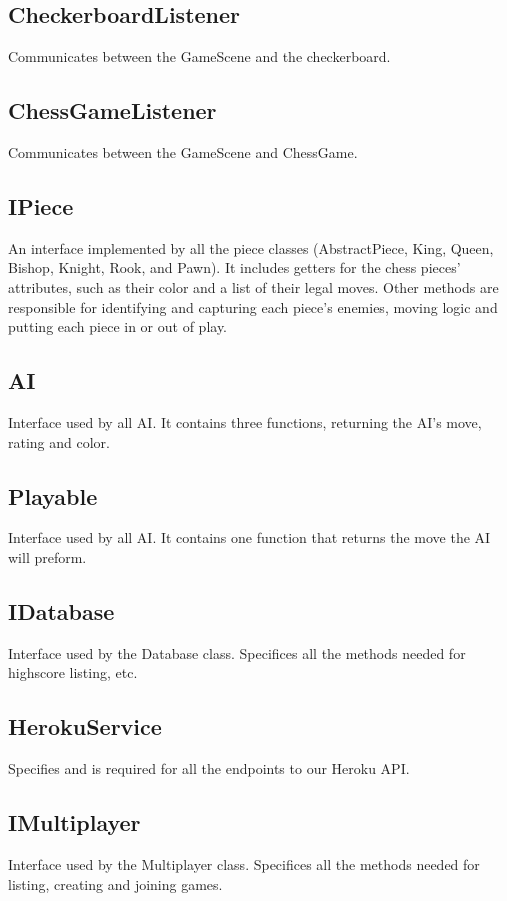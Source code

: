 \documentclass{article}
\begin{document}
\subsection {CheckerboardListener}
Communicates between the GameScene and the checkerboard. 

\subsection {ChessGameListener}
Communicates between the GameScene and ChessGame.

\subsection {IPiece}
An interface implemented by all the piece classes (AbstractPiece, King, Queen, Bishop, Knight, Rook, and Pawn). It includes getters for the chess pieces’ attributes, such as their color and a list of their legal moves. Other methods are responsible for identifying and capturing each piece’s enemies, moving logic and putting each piece in or out of play.

\subsection {AI}
Interface used by all AI. It contains three functions, returning  the AI’s move, rating and color.

\subsection {Playable}
Interface used by all AI. It  contains one function that returns the move the AI will preform.

\subsection {IDatabase}
Interface used by the Database class. Specifices all the methods needed for highscore listing, etc.

\subsection {HerokuService}
Specifies and is required for all the endpoints to our Heroku API.

\subsection {IMultiplayer}
Interface used by the Multiplayer class. Specifices all the methods needed for listing, creating and joining games.
\end{document}
